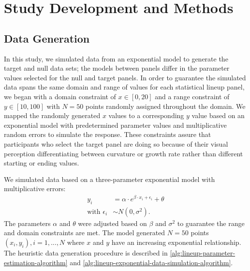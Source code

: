 \documentclass[12pt]{article}
\begin{document}
\hypertarget{methods}{%
\section{Study Development and Methods}\label{methods}}

\citep{Rstudio}

\hypertarget{data-generation}{%
\subsection{Data Generation}\label{data-generation}}

In this study, we simulated data from an exponential model to generate
the target and null data sets; the models between panels differ in the
parameter values selected for the null and target panels. In order to
guarantee the simulated data spans the same domain and range of values
for each statistical lineup panel, we began with a domain constraint of
\(x\in [0,20]\) and a range constraint of \(y\in [10,100]\) with
\(N = 50\) points randomly assigned throughout the domain. We mapped the
randomly generated \(x\) values to a corresponding \(y\) value based on
an exponential model with predetermined parameter values and
multiplicative random errors to simulate the response. These constraints
assure that participants who select the target panel are doing so
because of their visual perception differentiating between curvature or
growth rate rather than different starting or ending values.

We simulated data based on a three-parameter exponential model with
multiplicative errors: \begin{align}
y_i & = \alpha\cdot e^{\beta\cdot x_i + \epsilon_i} + \theta \\
\text{with } \epsilon_i & \sim N(0, \sigma^2). \nonumber
\end{align} The parameters \(\alpha\) and \(\theta\) were adjusted based
on \(\beta\) and \(\sigma^2\) to guarantee the range and domain
constraints are met. The model generated \(N = 50\) points
\((x_i, y_i), i = 1,...,N\) where \(x\) and \(y\) have an increasing
exponential relationship. The heuristic data generation procedure is
described in \cref{alg:lineup-parameter-estimation-algorithm} and
\cref{alg:lineup-exponential-data-simulation-algorithm}.
\end{document}
